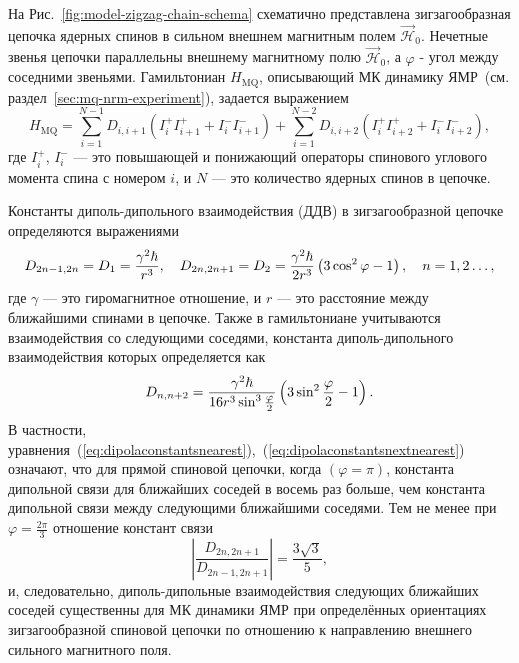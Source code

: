 На Рис.~\ref{fig:model-zigzag-chain-schema} схематично представлена
зигзагообразная цепочка ядерных спинов в сильном внешнем магнитным полем $\vec{\mathcal H}_0$.
Нечетные звенья цепочки параллельны внешнему магнитному полю $\vec{\mathcal H}_0$,
а $\varphi$ - угол между соседними звеньями.
Гамильтониан $H_\mathrm{MQ}$,
описывающий МК динамику ЯМР~(см. раздел~\ref{sec:mq-nrm-experiment}),
задается выражением~\cite{Doronin2000}
%
\begin{equation}\label{hmqnextnearest}
 H_\mathrm{MQ} = \sum_{i=1}^{N-1} D_{i, i+1}(I_i^{+}I_{i+1}^{+}+ I_i^{-}I_{i+1}^{-} )
   + \sum_{i=1}^{N-2} D_{i, i+2}(I_i^{+}I_{i+2}^{+}+ I_i^{-}I_{i+2}^{-} ) ,
\end{equation}
%
где $I_i^+$, $I_i^-$ --- это повышающей и понижающий операторы спинового углового момента спина с номером $i$,
и $N$ --- это количество ядерных спинов в цепочке.

Константы диполь-дипольного взаимодействия (ДДВ)
в зигзагообразной цепочке определяются выражениями~\cite{Abragam1982}
%
\begin{equation}\label{eq:dipolaconstantsnearest}
  D_{2n-1, 2n} = D_1 =\dfrac{\gamma^2\hbar }{r^3},
  \quad
  D_{2n, 2n+1} = D_2=\dfrac{\gamma^2\hbar }{2r^3}\left( 3\cos^2 \varphi -1 \right),
  \quad
  n=1,2\dots,
\end{equation}
где $\gamma$ --- это гиромагнитное отношение,
и $r$ --- это расстояние между ближайшими спинами в цепочке.
Также в гамильтониане учитываются взаимодействия со следующими соседями,
константа диполь-дипольного взаимодействия которых определяется как~\cite{Abragam1982}
%
\begin{equation}\label{eq:dipolaconstantsnextnearest}
  D_{n, n+2}=\dfrac{\gamma^2\hbar }{16r^3 \sin^3 \frac{\varphi}{2}}\left( 3\sin^2 \frac{\varphi}{2} -1 \right).
\end{equation}
%
В частности, уравнения~(\ref{eq:dipolaconstantsnearest}),~(\ref{eq:dipolaconstantsnextnearest}) означают,
что для прямой спиновой цепочки, когда  $(\varphi=\pi)$,
константа дипольной связи для ближайших соседей в восемь раз больше,
чем константа дипольной связи между следующими ближайшими соседями.
Тем не менее при $\varphi=\frac{2\pi}{3}$ отношение констант связи
\begin{equation}
  \left|\dfrac{D_{2n, 2n+1}}{D_{2n-1, 2n+1}}\right| = \dfrac{3\sqrt{3}}{5},
\end{equation}
и, следовательно,
диполь-дипольные взаимодействия следующих ближайших соседей
существенны для МК динамики ЯМР при определённых ориентациях зигзагообразной спиновой цепочки
по отношению к направлению внешнего сильного магнитного поля.


